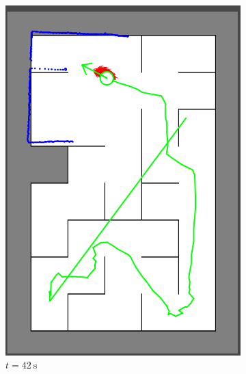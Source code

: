 \begin{figure}[H]
\begin{subfigure}{0.2\textwidth}
         \includegraphics[width=\textwidth]{figures/localization2_42s.png}
         \caption{$t = \SI{42}{\second}$}
         \label{mapping20s}
     \end{subfigure}\\
     \begin{subfigure}{0.2\textwidth}
         \centering

\end{subfigure}
\end{figure}
